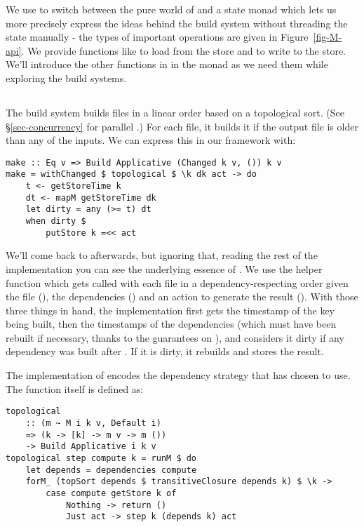 We use  to switch between the pure world of  and a state monad  which lets us more precisely express the ideas behind the build system without threading the state manually - the types of important operations are given in Figure~\ref{fig-M-api}. We provide functions like  to load from the store and  to write to the store. We'll introduce the other functions in in the monad  as we need them while exploring the build systems.

\subsection{\Make}\label{sec-implementation-make}

The \Make build system builds files in a linear order based on a topological sort.
(See \S\ref{sec-concurrency} for parallel \Make.)
For each file, it builds it if the output file is older than any of the inputs. We can express this in our framework with:

\begin{verbatim}
make :: Eq v => Build Applicative (Changed k v, ()) k v
make = withChanged $ topological $ \k dk act -> do
    t <- getStoreTime k
    dt <- mapM getStoreTime dk
    let dirty = any (>= t) dt
    when dirty $
        putStore k =<< act
\end{verbatim}

We'll come back to  afterwards, but ignoring that, reading the rest of the implementation you can see the underlying essence of \Make. We use the helper function  which gets called with each file in a dependency-respecting order given the file (), the dependencies () and an action to generate the result (). With those three things in hand, the implementation first gets the timestamp of the key being built, then the timestamps of the dependencies (which must have been rebuilt if necessary, thanks to the guarantees on ), and considers it dirty if any dependency was built after . If it is dirty, it rebuilds and stores the result.

The implementation of  encodes the dependency strategy that \Make has chosen to use. The function itself is defined as:

\begin{verbatim}
topological
    :: (m ~ M i k v, Default i)
    => (k -> [k] -> m v -> m ())
    -> Build Applicative i k v
topological step compute k = runM $ do
    let depends = dependencies compute
    forM_ (topSort depends $ transitiveClosure depends k) $ \k ->
        case compute getStore k of
            Nothing -> return ()
            Just act -> step k (depends k) act
\end{verbatim}

